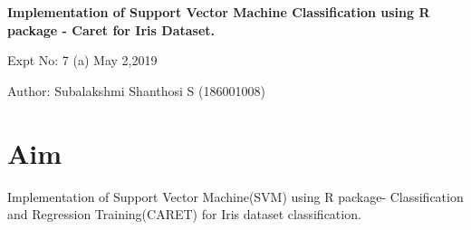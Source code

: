 \documentclass[a4paper,10pt]{article}
\begin{document}
\setcounter{secnumdepth}{-1} 
\begin{center}
\textbf{\LARGE  Implementation of Support Vector Machine Classification using R package - Caret for Iris Dataset.}
\end{center}

\raggedright Expt No: 7 (a) \hfill \raggedleft May 2,2019 \\ 

\raggedright Author: Subalakshmi Shanthosi S (186001008) \par 

\noindent\makebox[\linewidth]{\rule{\textwidth}{1pt}} 

\section{Aim}
Implementation of Support Vector Machine(SVM) using R package- Classification and Regression Training(CARET) for Iris dataset classification.
\end{document}

